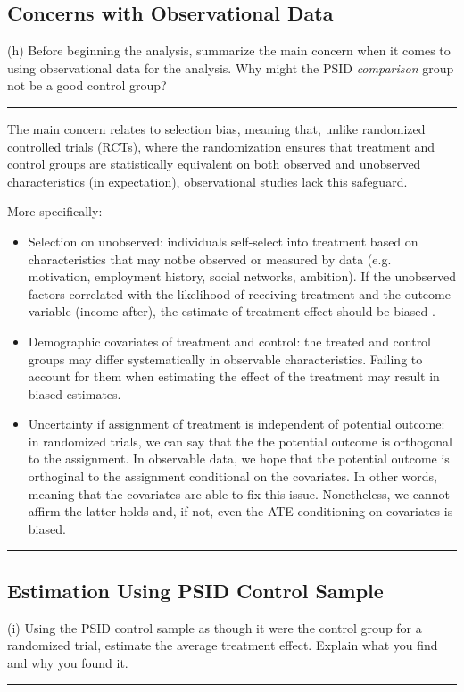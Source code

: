 \documentclass{article}
\newenvironment{colorparagraph}[1]{\par\color{#1}}{\par}
\begin{document}
\begin{colorparagraph}{questioncolor}
\label{q4h}\subsection{Concerns with Observational Data}
(h) Before beginning the analysis, summarize the main concern when it comes to using observational data for the analysis. Why might the PSID \textit{comparison} group not be a good control group?

\rule{\textwidth}{0.5pt}
\end{colorparagraph}

The main concern relates to selection bias, meaning that, unlike randomized controlled trials (RCTs), where the randomization ensures that treatment and control groups are statistically equivalent on both observed and unobserved characteristics (in expectation), observational studies lack this safeguard. 

More specifically:
\begin{itemize}
    \item Selection on unobserved: individuals self-select into treatment based on characteristics that may notbe observed or measured by data (e.g. motivation, employment history, social networks, ambition). If the unobserved factors correlated with the likelihood of receiving treatment and the outcome variable (income after), the estimate of treatment effect should be biased .
    \item Demographic covariates of treatment and control: the treated and control groups may differ systematically in observable characteristics. Failing to account for them when estimating the effect of the treatment may result in biased estimates.
    \item Uncertainty if assignment of treatment is independent of potential outcome: in randomized trials, we can say that the the potential outcome is orthogonal to the assignment. In observable data, we hope that the potential outcome is orthoginal to the assignment conditional on the covariates. In other words, meaning that the covariates are able to fix this issue. Nonetheless, we cannot affirm the latter holds and, if not, even the ATE conditioning on covariates is biased.
\end{itemize}

\begin{colorparagraph}{questioncolor}
\rule{\textwidth}{0.5pt}    

\label{q4i}\subsection{Estimation Using PSID Control Sample}
(i) Using the PSID control sample as though it were the control group for a randomized trial, estimate the average treatment effect. Explain what you find and why you found it.

\rule{\textwidth}{0.5pt}
\end{colorparagraph}
\end{document}
